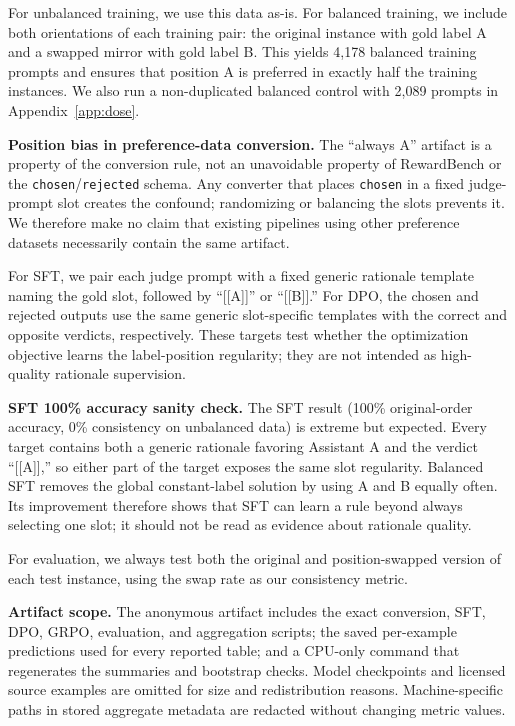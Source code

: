 \documentclass[letterpaper]{article}
\begin{document}
For unbalanced training, we use this data as-is. For balanced training, we include both orientations of each training pair: the original instance with gold label A and a swapped mirror with gold label B. This yields 4,178 balanced training prompts and ensures that position A is preferred in exactly half the training instances. We also run a non-duplicated balanced control with 2,089 prompts in Appendix~\ref{app:dose}.

\textbf{Position bias in preference-data conversion.} The ``always A'' artifact is a property of the conversion rule, not an unavoidable property of RewardBench or the \texttt{chosen}/\texttt{rejected} schema. Any converter that places \texttt{chosen} in a fixed judge-prompt slot creates the confound; randomizing or balancing the slots prevents it. We therefore make no claim that existing pipelines using other preference datasets necessarily contain the same artifact.

For SFT, we pair each judge prompt with a fixed generic rationale template naming the gold slot, followed by ``[[A]]'' or ``[[B]].'' For DPO, the chosen and rejected outputs use the same generic slot-specific templates with the correct and opposite verdicts, respectively. These targets test whether the optimization objective learns the label-position regularity; they are not intended as high-quality rationale supervision.

\textbf{SFT 100\% accuracy sanity check.} The SFT result (100\% original-order accuracy, 0\% consistency on unbalanced data) is extreme but expected. Every target contains both a generic rationale favoring Assistant A and the verdict ``[[A]],'' so either part of the target exposes the same slot regularity. Balanced SFT removes the global constant-label solution by using A and B equally often. Its improvement therefore shows that SFT can learn a rule beyond always selecting one slot; it should not be read as evidence about rationale quality.

For evaluation, we always test both the original and position-swapped version of each test instance, using the swap rate as our consistency metric.

\textbf{Artifact scope.} The anonymous artifact includes the exact conversion, SFT, DPO, GRPO, evaluation, and aggregation scripts; the saved per-example predictions used for every reported table; and a CPU-only command that regenerates the summaries and bootstrap checks. Model checkpoints and licensed source examples are omitted for size and redistribution reasons. Machine-specific paths in stored aggregate metadata are redacted without changing metric values.
\end{document}
